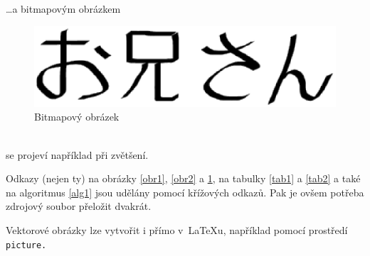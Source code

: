 \documentclass[11pt, a4paper]{article}
\begin{document}
\noindent
\dots a bitmapovým obrázkem
\begin{figure}[h] 
    \centering
    \includegraphics[scale=.6]{oniisan2.eps}
    \caption{Bitmapový obrázek}\label{obr3}
\end{figure} 
\bigskip 
\\
se projeví například při zvětšení.\par
Odkazy (nejen ty) na obrázky \ref{obr1}, \ref{obr2} a \ref{obr3}, na tabulky \ref{tab1} a \ref{tab2} a 
také na algoritmus \ref{alg1} jsou udělány pomocí křížových odkazů. 
Pak je ovšem potřeba zdrojový soubor přeložit dvakrát.\par
Vektorové obrázky lze vytvořit i přímo v~\LaTeX u, 
například pomocí prostředí \, \verb|picture.| \,
\end{document}
